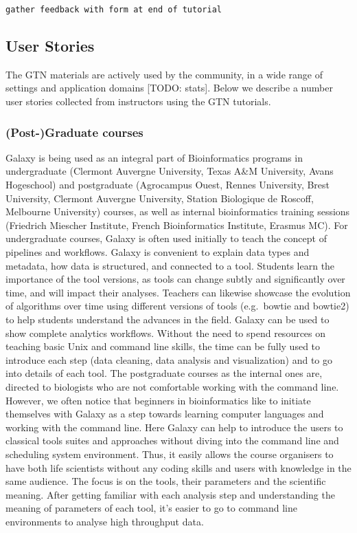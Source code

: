 \documentclass[10pt,letterpaper]{article}
\begin{document}
\verb+gather feedback with form at end of tutorial+

\subsection*{User Stories}

The GTN materials are actively used by the community, in a wide range of settings and application domains [TODO: stats].
Below we describe a number user stories collected from instructors using the GTN tutorials.

\subsubsection*{(Post-)Graduate courses}

Galaxy is being used as an integral part of Bioinformatics programs in undergraduate (Clermont Auvergne University, Texas A\&M University, Avans Hogeschool) and postgraduate (Agrocampus Ouest, Rennes University, Brest University, Clermont Auvergne University, Station Biologique de Roscoff, Melbourne University) courses, as well as internal bioinformatics training sessions (Friedrich Miescher Institute, French Bioinformatics Institute, Erasmus MC).
For undergraduate courses, Galaxy is often used initially to teach the concept of pipelines and workflows.
Galaxy is convenient to explain data types and metadata, how data is structured, and connected to a tool.
Students learn the importance of the tool versions, as tools can change subtly and significantly over time, and will impact their analyses. Teachers can likewise showcase the evolution of algorithms over time using different versions of tools (e.g.\ bowtie and bowtie2) to help students understand the advances in the field. Galaxy can be used to show complete analytics workflows.
Without the need to spend resources on teaching basic Unix and command line skills, the time can be fully used to introduce each step (data cleaning, data analysis and visualization) and to go into details of each tool.
The postgraduate courses as the internal ones are, directed to biologists who are not comfortable working with the command line.
However, we often notice that beginners in bioinformatics like to initiate themselves with Galaxy as a step towards learning computer languages and working with the command line.
Here Galaxy can help to introduce the users to classical tools suites and approaches without diving into the command line and scheduling system environment.
Thus, it easily allows the course organisers to have both life scientists without any coding skills and users with knowledge in the same audience. The focus is on the tools, their parameters and the scientific meaning.
After getting familiar with each analysis step and understanding the meaning of parameters of each tool, it’s easier to go to command line environments to analyse high throughput data.
\end{document}
